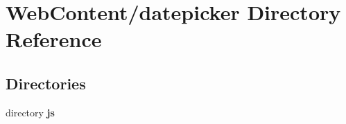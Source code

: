 \section{Web\-Content/datepicker Directory Reference}
\label{dir_5d456556af7ed835f8332c51d06186a8}
\subsection*{Directories}
\begin{DoxyCompactItemize}
\item 
directory {\bf js}
\end{DoxyCompactItemize}
